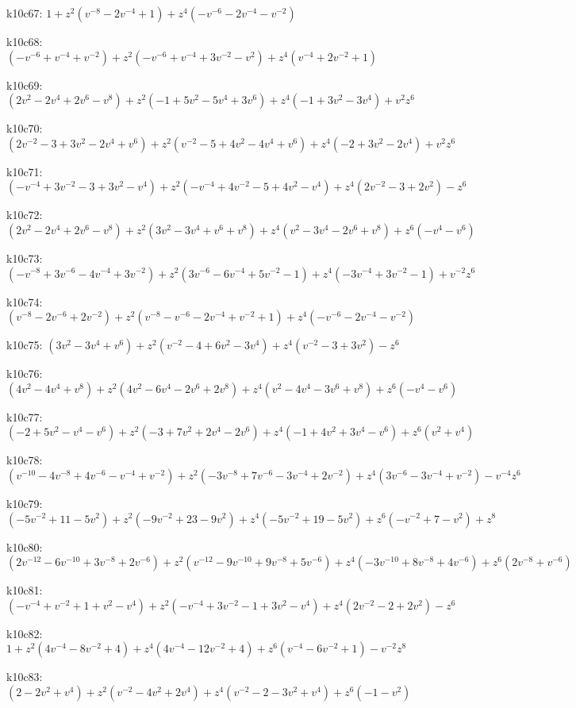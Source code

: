 k10c67: $ 1  +z^{2}(v^{-8}-2v^{-4}+1)  +z^{4}(-v^{-6}-2v^{-4}-v^{-2}) $ 

k10c68: $ (-v^{-6}+v^{-4}+v^{-2})  +z^{2}(-v^{-6}+v^{-4}+3v^{-2}-v^{2})  +z^{4}(v^{-4}+2v^{-2}+1) $ 

k10c69: $ (2v^{2}-2v^{4}+2v^{6}-v^{8})  +z^{2}(-1+5v^{2}-5v^{4}+3v^{6})  +z^{4}(-1+3v^{2}-3v^{4})  +v^{2}z^{6} $ 

k10c70: $ (2v^{-2}-3+3v^{2}-2v^{4}+v^{6})  +z^{2}(v^{-2}-5+4v^{2}-4v^{4}+v^{6})  +z^{4}(-2+3v^{2}-2v^{4})  +v^{2}z^{6} $ 

k10c71: $ (-v^{-4}+3v^{-2}-3+3v^{2}-v^{4})  +z^{2}(-v^{-4}+4v^{-2}-5+4v^{2}-v^{4})  +z^{4}(2v^{-2}-3+2v^{2})  -z^{6} $ 

k10c72: $ (2v^{2}-2v^{4}+2v^{6}-v^{8})  +z^{2}(3v^{2}-3v^{4}+v^{6}+v^{8})  +z^{4}(v^{2}-3v^{4}-2v^{6}+v^{8})  +z^{6}(-v^{4}-v^{6}) $ 

k10c73: $ (-v^{-8}+3v^{-6}-4v^{-4}+3v^{-2})  +z^{2}(3v^{-6}-6v^{-4}+5v^{-2}-1)  +z^{4}(-3v^{-4}+3v^{-2}-1)  +v^{-2}z^{6} $ 

k10c74: $ (v^{-8}-2v^{-6}+2v^{-2})  +z^{2}(v^{-8}-v^{-6}-2v^{-4}+v^{-2}+1)  +z^{4}(-v^{-6}-2v^{-4}-v^{-2}) $ 

k10c75: $ (3v^{2}-3v^{4}+v^{6})  +z^{2}(v^{-2}-4+6v^{2}-3v^{4})  +z^{4}(v^{-2}-3+3v^{2})  -z^{6} $ 

k10c76: $ (4v^{2}-4v^{4}+v^{8})  +z^{2}(4v^{2}-6v^{4}-2v^{6}+2v^{8})  +z^{4}(v^{2}-4v^{4}-3v^{6}+v^{8})  +z^{6}(-v^{4}-v^{6}) $ 

k10c77: $ (-2+5v^{2}-v^{4}-v^{6})  +z^{2}(-3+7v^{2}+2v^{4}-2v^{6})  +z^{4}(-1+4v^{2}+3v^{4}-v^{6})  +z^{6}(v^{2}+v^{4}) $ 

k10c78: $ (v^{-10}-4v^{-8}+4v^{-6}-v^{-4}+v^{-2})  +z^{2}(-3v^{-8}+7v^{-6}-3v^{-4}+2v^{-2})  +z^{4}(3v^{-6}-3v^{-4}+v^{-2})  -v^{-4}z^{6} $ 

k10c79: $ (-5v^{-2}+11-5v^{2})  +z^{2}(-9v^{-2}+23-9v^{2})  +z^{4}(-5v^{-2}+19-5v^{2})  +z^{6}(-v^{-2}+7-v^{2})  +z^{8} $ 

k10c80: $ (2v^{-12}-6v^{-10}+3v^{-8}+2v^{-6})  +z^{2}(v^{-12}-9v^{-10}+9v^{-8}+5v^{-6})  +z^{4}(-3v^{-10}+8v^{-8}+4v^{-6})  +z^{6}(2v^{-8}+v^{-6}) $ 

k10c81: $ (-v^{-4}+v^{-2}+1+v^{2}-v^{4})  +z^{2}(-v^{-4}+3v^{-2}-1+3v^{2}-v^{4})  +z^{4}(2v^{-2}-2+2v^{2})  -z^{6} $ 

k10c82: $ 1  +z^{2}(4v^{-4}-8v^{-2}+4)  +z^{4}(4v^{-4}-12v^{-2}+4)  +z^{6}(v^{-4}-6v^{-2}+1)  -v^{-2}z^{8} $ 

k10c83: $ (2-2v^{2}+v^{4})  +z^{2}(v^{-2}-4v^{2}+2v^{4})  +z^{4}(v^{-2}-2-3v^{2}+v^{4})  +z^{6}(-1-v^{2}) $ 

